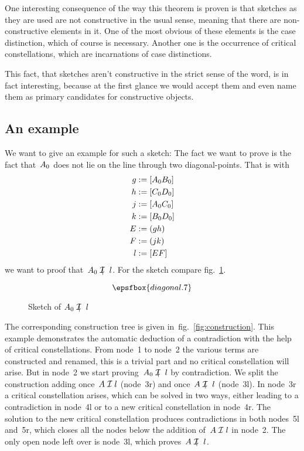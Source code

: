 One interesting consequence of the way this theorem is proven is that
sketches as they are used are not constructive in the usual sense,
meaning that there are non-constructive elements in it. One of the
most obvious of these elements is the case distinction, which of
course is necessary. Another one is the occurrence of critical
constellations, which are incarnations of case distinctions.

This fact, that sketches aren't constructive in the strict sense of
the word, is in fact interesting, because at the first glance we would
accept them and even name them as primary candidates for constructive
objects. 


\subsection{An example}
\label{sec:herbrandsketch:example}

We want to give an example for such a sketch: The fact we want to
prove is the fact that~$A_0$ does not lie on the line through two
diagonal-points. That is with
\begin{align*}
  g &:= [A_0B_0]\\
  h &:= [C_0D_0]\\
  j &:= [A_0C_0]\\
  k &:= [B_0D_0]\\
  E &:= (gh)\\
  F &:= (jk)\\
  l &:= [EF]
\end{align*}
we want to proof that~$\ao\notcI l$. For the sketch compare
fig.~\ref{fig:diagonal}. 

\begin{figure}[ht!]
  \[\epsfbox{diagonal.7}\]
  \caption{Sketch of $\ao\notcI l$}
  \label{fig:diagonal} 
\end{figure}

The corresponding construction tree is given
in~fig.~\ref{fig:construction}. This example demonstrates the
automatic deduction of a contradiction with the help of critical
constellations. From node~1 to node~2 the various terms are
constructed and renamed, this is a trivial part and no critical
constellation will arise. But in node~2 we start proving~$\ao\notcI l$
by contradiction. We split the construction adding once~$A\cI l$
(node~3r) and once~$A\notcI l$ (node~3l). In node~3r a critical
constellation arises, which can be solved in two ways, either leading
to a contradiction in node~4l or to a new critical constellation in
node~4r. The solution to the new critical constellation produces
contradictions in both nodes~5l and~5r, which closes all the nodes
below the addition of~$A\cI l$ in node~2. The only open node left over
is node~3l, which proves~$A\notcI l$.

